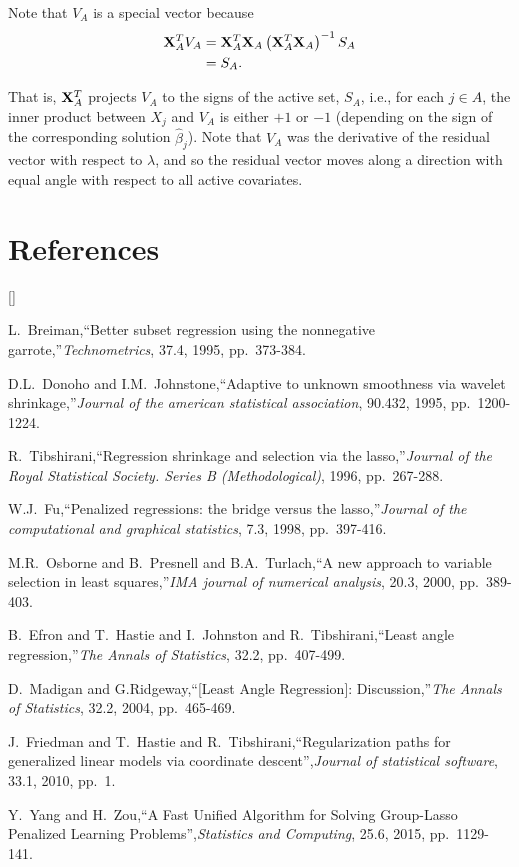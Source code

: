 \documentclass[twoside]{article}
\def\beginrefs{\begin{list}%
        {[\arabic{equation}]}{\usecounter{equation}
         \setlength{\leftmargin}{2.0truecm}\setlength{\labelsep}{0.4truecm}%
         \setlength{\labelwidth}{1.6truecm}}}
\def\endrefs{\end{list}}
\def\bibentry#1{\item[\hbox{[#1]}]}
\begin{document}
Note that $V_A$ is a special vector because
\begin{align*}
	{\bf X}^T_A V_A &= {\bf X}^T_A {\bf X}_A \left( {\bf X}^T_A {\bf X}_A \right)^{-1} S_A \\
	&= S_A.
\end{align*}

That is, ${\bf X}^T_A$ projects $V_A$ to the signs of the active set, $S_A$, i.e., for each $j \in A$, the inner product between $X_j$ and $V_A$ is either $+1$ or $-1$ (depending on the sign of the corresponding solution $\widehat \beta_j$). Note that $V_A$ was the derivative of the residual vector with respect to $\lambda$, and so the residual vector moves along a direction with equal angle with respect to all active covariates.

\section*{References}
\beginrefs
\bibentry{B95}{\sc L.~Breiman},``Better subset regression using the nonnegative garrote,''{\it Technometrics}, 37.4, 1995, pp.~373-384.
\bibentry{DJ95}{\sc D.L.~Donoho} and {\sc I.M.~Johnstone},``Adaptive to unknown smoothness via wavelet shrinkage,''{\it Journal of the american statistical association}, 90.432, 1995, pp.~1200-1224.
\bibentry{T96}{\sc R.~Tibshirani},``Regression shrinkage and selection via the lasso,''{\it Journal of the Royal Statistical Society. Series B (Methodological)}, 1996, pp.~267-288.
\bibentry{F98}{\sc W.J.~Fu},``Penalized regressions: the bridge versus the lasso,''{\it Journal of the computational and graphical statistics}, 7.3, 1998, pp.~397-416.
\bibentry{OPB00}{\sc M.R.~Osborne} and {\sc B.~Presnell} and {\sc B.A.~Turlach},``A new approach to variable selection in least squares,''{\it IMA journal of numerical analysis}, 20.3, 2000, pp.~389-403. 
\bibentry{EHJT04}{\sc B.~Efron} and {\sc T.~Hastie} and {\sc I.~Johnston} and {\sc R.~Tibshirani},``Least angle regression,''{\it The Annals of Statistics}, 32.2, pp.~407-499.
\bibentry{MR04}{\sc D.~Madigan} and {\sc G.Ridgeway},``[Least Angle Regression]: Discussion,''{\it The Annals of Statistics}, 32.2, 2004, pp.~465-469.
\bibentry{FHT10}{\sc J.~Friedman} and {\sc T.~Hastie} and {\sc R.~Tibshirani},``Regularization paths for generalized linear models via coordinate descent'',{\it Journal of statistical software}, 33.1, 2010, pp.~1.
\bibentry{YZ15}{\sc Y.~Yang} and {\sc H.~Zou},``A Fast Unified Algorithm for Solving Group-Lasso Penalized Learning Problems'',{\it Statistics and Computing}, 25.6, 2015, pp.~1129-141.
\endrefs
\end{document}
